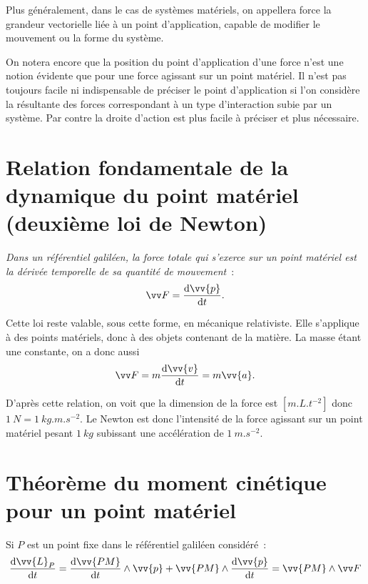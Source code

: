Plus généralement, dans le cas de systèmes matériels, on appellera force la
grandeur vectorielle liée à un point d'application, capable de modifier le
mouvement ou la forme du système.

On notera encore que la position du point d'application d'une force n'est une
notion évidente que pour une force agissant sur un point matériel. Il n'est pas
toujours facile ni indispensable de préciser le point d'application si l'on
considère la résultante des forces correspondant à un type d'interaction subie
par un système. Par contre la droite d'action est plus facile à préciser et
plus nécessaire.

\section{Relation fondamentale de la dynamique du point matériel (deuxième loi
de Newton)}
\label{chap2-sec:relationfondamentaledeladynamique}%

\emph{Dans un référentiel galiléen, la force totale qui s'exerce sur un point
matériel est la dérivée temporelle de sa quantité de mouvement}~:
\begin{equation}%
  \vF = \derived{\vv{p}}{t}.
\end{equation}%

Cette loi reste valable, sous cette forme, en mécanique relativiste. Elle
s'applique à des points matériels, donc à des objets contenant de la matière.
La masse étant une constante, on a donc aussi \begin{equation} \vF = m
\derived{\vv{v}}{t}=m\vv{a}. \end{equation}%

D'après cette relation, on voit que la dimension de la force est
\([m.L.t^{-2}]\) donc \(\SI{1}{N}=\SI{1}{kg.m.s^{-2}}\). Le Newton est donc
l'intensité de la force agissant sur un point matériel pesant \(\SI{1}{kg}\)
subissant une accélération de \(\SI{1}{m.s^{-2}}\).

\section{Théorème du moment cinétique pour un point matériel}%
\label{chap2-sec:theoremedumomentcinetique}%

Si \(P\) est un point fixe dans le référentiel galiléen considéré~:
\begin{equation}%
  \derived{\vv{L}_P}{t} = \derived{\vv{PM}}{t} \wedge \vv{p} +\vv{PM} \wedge
  \derived{\vv{p}}{t} = \vv{PM} \wedge \vF
\end{equation}%

